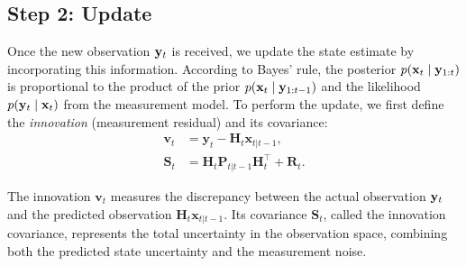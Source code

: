 
    
\subsection*{Step 2: Update} 
Once the new observation $\mathbf{y}_t$ is received, we update the state estimate by incorporating this information. According to Bayes' rule, the posterior $p(\mathbf{x}_t \mid \mathbf{y}_{1:t})$ is proportional to the product of the prior $p(\mathbf{x}_t \mid \mathbf{y}_{1:t-1})$ and the likelihood $p(\mathbf{y}_t \mid \mathbf{x}_t)$ from the measurement model. To perform the update, we first define the \textit{innovation} (measurement residual) and its covariance:
\begin{align}                
    \mathbf{v}_t &= \mathbf{y}_t - \mathbf{H}_t \mathbf{x}_{t|t-1}, \\
    \mathbf{S}_t &= \mathbf{H}_t \mathbf{P}_{t|t-1} \mathbf{H}_t^\top + \mathbf{R}_t.
\end{align}

The innovation $\mathbf{v}_t$ measures the discrepancy between the actual observation $\mathbf{y}_t$ and the predicted observation $\mathbf{H}_t \mathbf{x}_{t|t-1}$. Its covariance $\mathbf{S}_t$, called the innovation covariance, represents the total uncertainty in the observation space, combining both the predicted state uncertainty and the measurement noise.  

